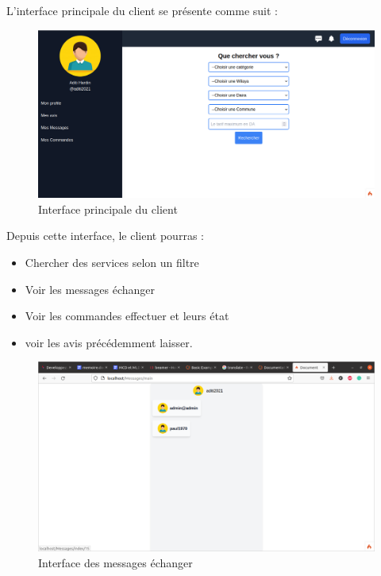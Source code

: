 \documentclass[french]{report}
\begin{document}
L'interface principale du client se présente comme suit :
\begin{figure}[H]
    \centering
    \includegraphics[width=1\textwidth]{images/client dash.png}
    \caption{Interface principale du client}
\end{figure}

Depuis cette interface, le client pourras :
\begin{itemize}
    \item Chercher des services selon un filtre
    \item Voir les messages échanger
    \item Voir les commandes effectuer et leurs état
    \item voir les avis précédemment laisser.
\end{itemize}

\begin{figure}[H]
    \centering
    \includegraphics[width=1\textwidth]{images/messages.png}
    \caption{Interface des messages échanger}
\end{figure}
\end{document}
